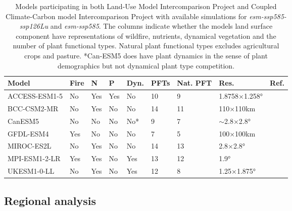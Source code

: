 \documentclass[]{article}
\begin{document}
\begin{table}[H]
    \centering
    \begin{tabular}{lllllllll}
        \hline
Model         & Fire & N   & P   & Dyn. & PFTs & Nat. PFT & Res. & Ref.                                         \\ \hline
ACCESS-ESM1-5 & No   & Yes & Yes & No    & 10       & 9       & 1.8758×1.258°   & \cite{ziehn_australian_2020}   \\
BCC-CSM2-MR   & No   & Yes & No  & No    & 14       & 11      & 110×110km       & \cite{li_development_2019}     \\
CanESM5       & No   & No  & No  & No*   & 9        & 7       & $\sim$2.8×2.8°       & \cite{swart_canadian_2019}     \\
GFDL-ESM4     & Yes  & No  & No  & No    & 7        & 5       & 100×100km       & \cite{dunne_gfdl_2020}         \\
MIROC-ES2L    & No   & Yes & No  & No    & 14       & 13      & 2.8×2.8°        & \cite{hajima_development_2020} \\
MPI-ESM1-2-LR & Yes  & Yes & No  & Yes   & 13       & 12      & 1.9°            & \cite{giorgetta_climate_2013}  \\
UKESM1-0-LL   & No   & Yes & No  & Yes   & 12       & 8       & 1.25×1.875°     & \cite{sellar_ukesm1_2019}      \\ \hline
    \end{tabular}
    \caption{Models participating in both Land-Use Model Intercomparison Project and Coupled Climate-Carbon model Intercomparison Project with available simulations for \textit{esm-ssp585-ssp126Lu} and \textit{esm-ssp585}. The columns indicate whether the models land surface component have representations of wildfire, nutrients, dynamical vegetation and the number of plant functional types. Natural plant functional types excludes agricultural crops and pasture. *Can-ESM5 does have plant dynamics in the sense of plant demographics but not dynamical plant type competition.}
    \label{tab:models}
\end{table}

\subsection{Regional analysis}
\end{document}
